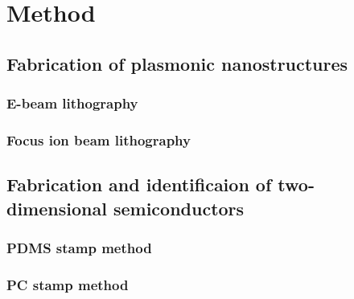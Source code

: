 
\chapter{Method}
\label{sec:Method}


\section{Fabrication of plasmonic nanostructures}

\subsection{E-beam lithography}

\subsection{Focus ion beam lithography}


\section{Fabrication and identificaion of two-dimensional semiconductors}

\subsection{PDMS stamp method}

\subsection{PC stamp method}

